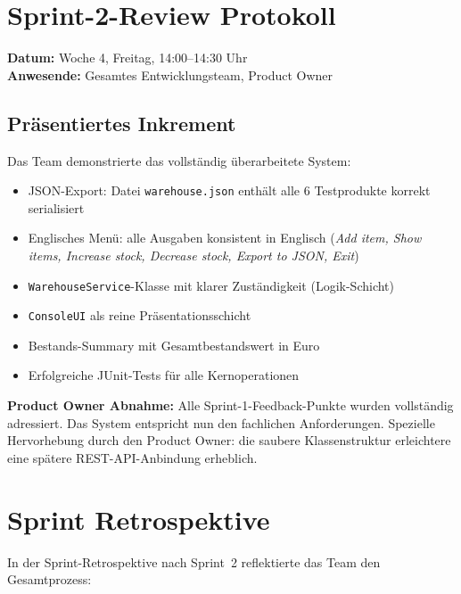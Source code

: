 \documentclass[12pt, a4paper, twoside]{report}
\begin{document}
\section{Sprint-2-Review \textendash{} Protokoll}

\textbf{Datum:} Woche 4, Freitag, 14:00--14:30 Uhr\\
\textbf{Anwesende:} Gesamtes Entwicklungsteam, Product Owner

\subsection{Präsentiertes Inkrement}

Das Team demonstrierte das vollständig überarbeitete System:

\begin{itemize}[leftmargin=1.5em]
  \item JSON-Export: Datei \texttt{warehouse.json} enthält alle 6 Testprodukte korrekt serialisiert
  \item Englisches Menü: alle Ausgaben konsistent in Englisch (\textit{Add item, Show items,
        Increase stock, Decrease stock, Export to JSON, Exit})
  \item \texttt{WarehouseService}-Klasse mit klarer Zuständigkeit (Logik-Schicht)
  \item \texttt{ConsoleUI} als reine Präsentationsschicht
  \item Bestands-Summary mit Gesamtbestandswert in Euro
  \item Erfolgreiche JUnit-Tests für alle Kernoperationen
\end{itemize}

\begin{successbox}
  \textbf{Product Owner Abnahme:} Alle Sprint-1-Feedback-Punkte wurden vollständig adressiert.
  Das System entspricht nun den fachlichen Anforderungen. Spezielle Hervorhebung durch den
  Product Owner: die saubere Klassenstruktur erleichtere eine spätere REST-API-Anbindung erheblich.
\end{successbox}

\section{Sprint Retrospektive}

In der Sprint-Retrospektive nach Sprint~2 reflektierte das Team den Gesamtprozess:
\end{document}
